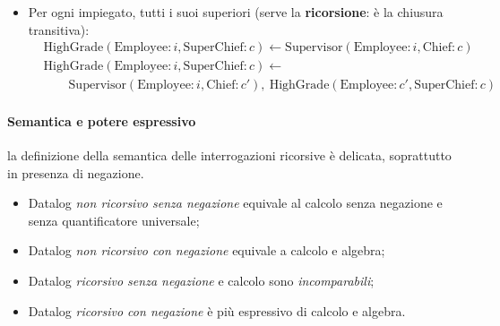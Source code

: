 \documentclass[a4paper,12pt]{article}
\begin{document}
\begin{itemize}
\begin{align*}
      & \qquad \text{Supervisor}(\text{Chief}: c, \text{Employee}: m),\\
      & \qquad \text{Employee}(\text{Number}: m, \text{Name}: n, \text{Age}: e, \text{Salary}: s),\ s \leq 40\\
      & \text{ChiefsOfOnlyRichE}(\text{Number}: c, \text{Name}: n) \leftarrow\\
      & \qquad \text{Employee}(\text{Number}: c, \text{Name}: n, \text{Age}: e, \text{Salary}: s),\\
      & \qquad \text{Supervisor}(\text{Chief}: c, \text{Employee}: m),\\
      & \qquad \text{not ChiefsOfNoRichE}(\text{Chief}: c)\\
      & ?\ \text{ChiefsOfOnlyRichE}(\text{Number}: c, \text{Name}: n)
    \end{align*}
  \item Per ogni impiegato, tutti i suoi superiori (serve la
    \textbf{ricorsione}: è la chiusura transitiva):
    \begin{align*}
      & \text{HighGrade}(\text{Employee}: i, \text{SuperChief}: c) \leftarrow
        \text{Supervisor}(\text{Employee}: i, \text{Chief}: c)\\
      & \text{HighGrade}(\text{Employee}: i, \text{SuperChief}: c) \leftarrow\\
      & \qquad \text{Supervisor}(\text{Employee}: i, \text{Chief}: c'),\
        \text{HighGrade}(\text{Employee}: c', \text{SuperChief}: c)
    \end{align*}
\end{itemize}

\paragraph{Semantica e potere espressivo} la definizione della semantica delle
interrogazioni ricorsive è delicata, soprattutto in presenza di negazione.
\begin{itemize}
  \item Datalog \emph{non ricorsivo senza negazione} equivale al calcolo senza
    negazione e senza quantificatore universale;
  \item Datalog \emph{non ricorsivo con negazione} equivale a calcolo e
    algebra;
  \item Datalog \emph{ricorsivo senza negazione} e calcolo sono
    \emph{incomparabili};
  \item Datalog \emph{ricorsivo con negazione} è più espressivo di calcolo e
    algebra.
\end{itemize}
\end{document}
